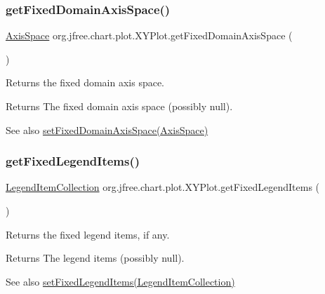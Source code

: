 \subsubsection{\texorpdfstring{get\+Fixed\+Domain\+Axis\+Space()}{getFixedDomainAxisSpace()}}
{\footnotesize\ttfamily \mbox{\hyperlink{classorg_1_1jfree_1_1chart_1_1axis_1_1_axis_space}{Axis\+Space}} org.\+jfree.\+chart.\+plot.\+X\+Y\+Plot.\+get\+Fixed\+Domain\+Axis\+Space (\begin{DoxyParamCaption}{ }\end{DoxyParamCaption})}

Returns the fixed domain axis space.

\begin{DoxyReturn}{Returns}
The fixed domain axis space (possibly {\ttfamily null}).
\end{DoxyReturn}
\begin{DoxySeeAlso}{See also}
\mbox{\hyperlink{classorg_1_1jfree_1_1chart_1_1plot_1_1_x_y_plot_ae1a120279c51a385f7b7bcf2b564f32f}{set\+Fixed\+Domain\+Axis\+Space(\+Axis\+Space)}} 
\end{DoxySeeAlso}
\mbox{\label{classorg_1_1jfree_1_1chart_1_1plot_1_1_x_y_plot_aef746e72a753b6205a56c53b219cf9c2}} 
\subsubsection{\texorpdfstring{get\+Fixed\+Legend\+Items()}{getFixedLegendItems()}}
{\footnotesize\ttfamily \mbox{\hyperlink{classorg_1_1jfree_1_1chart_1_1_legend_item_collection}{Legend\+Item\+Collection}} org.\+jfree.\+chart.\+plot.\+X\+Y\+Plot.\+get\+Fixed\+Legend\+Items (\begin{DoxyParamCaption}{ }\end{DoxyParamCaption})}

Returns the fixed legend items, if any.

\begin{DoxyReturn}{Returns}
The legend items (possibly {\ttfamily null}).
\end{DoxyReturn}
\begin{DoxySeeAlso}{See also}
\mbox{\hyperlink{classorg_1_1jfree_1_1chart_1_1plot_1_1_x_y_plot_a2cf1eedb574018155003b6a411fe691c}{set\+Fixed\+Legend\+Items(\+Legend\+Item\+Collection)}} 
\end{DoxySeeAlso}
\mbox{\label{classorg_1_1jfree_1_1chart_1_1plot_1_1_x_y_plot_a26ddb69807bccbfb340cab756a2e0521}} 
